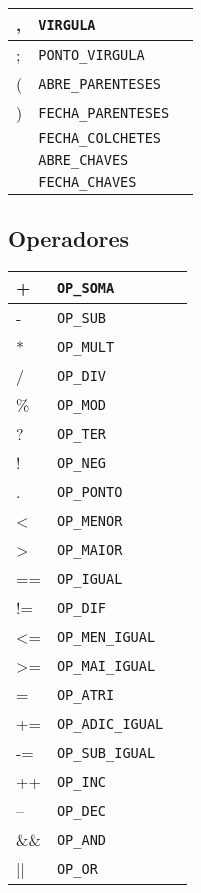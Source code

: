 \documentclass{article}
\begin{document}
	\begin{tabularx}{0.8\textwidth} { 
			| >{\raggedright\arraybackslash}X 
			| >{\centering\arraybackslash}X 
			| >{\raggedleft\arraybackslash}X | }
		\hline
		, & \texttt{VIRGULA} \\
		\hline
		; & \texttt{PONTO\_VIRGULA} \\
		\hline
		( & \texttt{ABRE\_PARENTESES} \\
		\hline
		) & \texttt{FECHA\_PARENTESES} \\
		\hline
		[ & \texttt{ABRE\_COLCHETES} \\
		\hline
		] & \texttt{FECHA\_COLCHETES} \\
		\hline
		{ & \texttt{ABRE\_CHAVES} \\
			\hline
		} & \texttt{FECHA\_CHAVES} \\
		\hline
	\end{tabularx} 
	
	\subsection{Operadores}
	
	\begin{tabularx}{0.8\textwidth} { 
			| >{\raggedright\arraybackslash}X 
			| >{\centering\arraybackslash}X 
			| >{\raggedleft\arraybackslash}X | }
		\hline
		+ & \texttt{OP\_SOMA} \\
		\hline
		- & \texttt{OP\_SUB} \\
		\hline
		* & \texttt{OP\_MULT} \\
		\hline
		/ & \texttt{OP\_DIV} \\
		\hline
		\% & \texttt{OP\_MOD} \\
		\hline
		? & \texttt{OP\_TER} \\
		\hline
		! & \texttt{OP\_NEG} \\
		\hline
		. & \texttt{OP\_PONTO} \\
		\hline
		< & \texttt{OP\_MENOR} \\
		\hline
		> & \texttt{OP\_MAIOR} \\
		\hline
		== & \texttt{OP\_IGUAL} \\
		\hline
		!= & \texttt{OP\_DIF} \\
		\hline
		<= & \texttt{OP\_MEN\_IGUAL} \\
		\hline
		>= & \texttt{OP\_MAI\_IGUAL} \\
		\hline
		= & \texttt{OP\_ATRI} \\
		\hline
		+= &  \texttt{OP\_ADIC\_IGUAL} \\
		\hline
		-= &  \texttt{OP\_SUB\_IGUAL} \\
		\hline
		++ &  \texttt{OP\_INC} \\
		\hline
		-- &  \texttt{OP\_DEC} \\
		\hline
		\&\& &  \texttt{OP\_AND} \\
		\hline
		|| &  \texttt{OP\_OR} \\
		\hline
	\end{tabularx}
	
\end{document}
